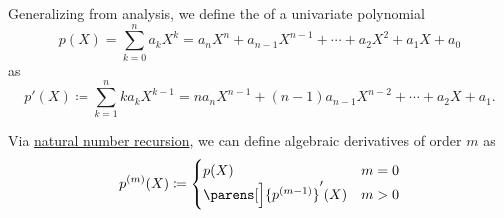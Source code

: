 \begin{definition}\label{def:algebraic_derivative}
  Generalizing  from analysis, we define the  of a univariate polynomial
  \begin{equation*}
    p(X) = \sum_{k=0}^n a_k X^k = a_n X^n + a_{n-1} X^{n-1} + \cdots + a_2 X^2 + a_1 X + a_0
  \end{equation*}
  as
  \begin{equation*}
    p'(X) \coloneqq \sum_{k=1}^n k a_k X^{k-1} = n a_n X^{n-1} + (n-1) a_{n-1} X^{n-2} + \cdots + a_2 X + a_1.
  \end{equation*}

  Via \hyperref[rem:natural_number_recursion]{natural number recursion}, we can define algebraic derivatives of order \( m \) as
  \begin{equation*}
    p^{(m)}(X) \coloneqq \begin{cases}
      p(X)              &m = 0 \\
      \parens[\Big]{ p^{(m - 1)} }'(X) &m > 0
    \end{cases}
  \end{equation*}
\end{definition}

